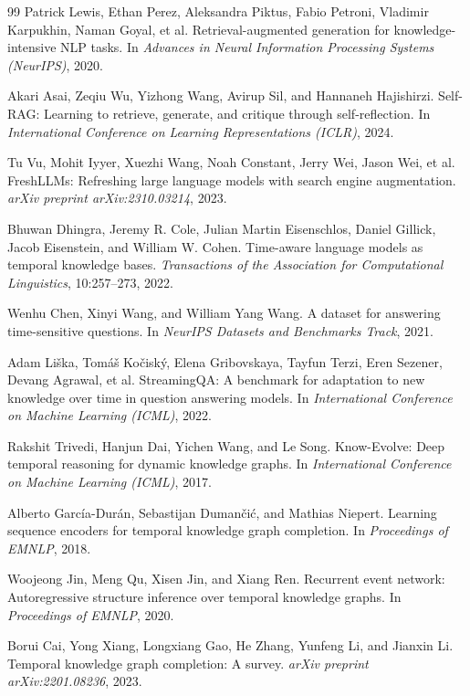 \documentclass[11pt,a4paper]{article}
\begin{document}
\begin{thebibliography}{99}
Patrick Lewis, Ethan Perez, Aleksandra Piktus, Fabio Petroni, Vladimir Karpukhin, Naman Goyal, et al.
Retrieval-augmented generation for knowledge-intensive NLP tasks.
In \textit{Advances in Neural Information Processing Systems (NeurIPS)}, 2020.

Akari Asai, Zeqiu Wu, Yizhong Wang, Avirup Sil, and Hannaneh Hajishirzi.
Self-RAG: Learning to retrieve, generate, and critique through self-reflection.
In \textit{International Conference on Learning Representations (ICLR)}, 2024.

Tu Vu, Mohit Iyyer, Xuezhi Wang, Noah Constant, Jerry Wei, Jason Wei, et al.
FreshLLMs: Refreshing large language models with search engine augmentation.
\textit{arXiv preprint arXiv:2310.03214}, 2023.

Bhuwan Dhingra, Jeremy R. Cole, Julian Martin Eisenschlos, Daniel Gillick, Jacob Eisenstein, and William W. Cohen.
Time-aware language models as temporal knowledge bases.
\textit{Transactions of the Association for Computational Linguistics}, 10:257--273, 2022.

Wenhu Chen, Xinyi Wang, and William Yang Wang.
A dataset for answering time-sensitive questions.
In \textit{NeurIPS Datasets and Benchmarks Track}, 2021.

Adam Li\v{s}ka, Tom\'a\v{s} Ko\v{c}isk\'y, Elena Gribovskaya, Tayfun Terzi, Eren Sezener, Devang Agrawal, et al.
StreamingQA: A benchmark for adaptation to new knowledge over time in question answering models.
In \textit{International Conference on Machine Learning (ICML)}, 2022.

Rakshit Trivedi, Hanjun Dai, Yichen Wang, and Le Song.
Know-Evolve: Deep temporal reasoning for dynamic knowledge graphs.
In \textit{International Conference on Machine Learning (ICML)}, 2017.

Alberto Garc\'ia-Dur\'an, Sebastijan Duman\v{c}i\'c, and Mathias Niepert.
Learning sequence encoders for temporal knowledge graph completion.
In \textit{Proceedings of EMNLP}, 2018.

Woojeong Jin, Meng Qu, Xisen Jin, and Xiang Ren.
Recurrent event network: Autoregressive structure inference over temporal knowledge graphs.
In \textit{Proceedings of EMNLP}, 2020.

Borui Cai, Yong Xiang, Longxiang Gao, He Zhang, Yunfeng Li, and Jianxin Li.
Temporal knowledge graph completion: A survey.
\textit{arXiv preprint arXiv:2201.08236}, 2023.


\end{thebibliography}
\end{document}

